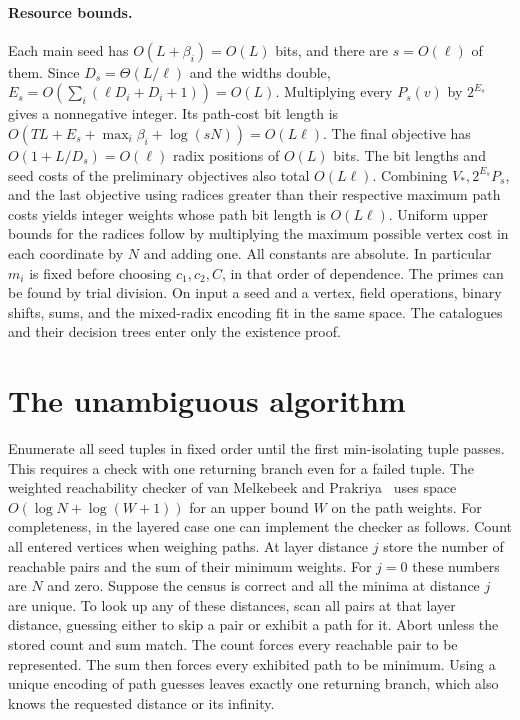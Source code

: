 \documentclass[11pt]{article}
\begin{document}
\paragraph{Resource bounds.}
Each main seed has $O(L+\beta_i)=O(L)$ bits, and there are $s=O(\ell)$
of them. Since $D_s=\Theta(L/\ell)$ and the widths double,
$E_s=O(\sum_i(\ell D_i+D_i+1))=O(L)$. Multiplying every $P_s(v)$ by
$2^{E_s}$ gives a nonnegative integer. Its path-cost bit length is
$O(TL+E_s+\max_i\beta_i+\log(sN))=O(L\ell)$.
The final objective has $O(1+L/D_s)=O(\ell)$ radix positions of
$O(L)$ bits. The bit lengths and seed costs of the preliminary
objectives also total $O(L\ell)$. Combining $V_*,2^{E_s}P_s$, and the
last objective using radices greater than their respective maximum
path costs yields integer weights whose path bit length is $O(L\ell)$.
Uniform upper bounds for the radices follow by multiplying the
maximum possible vertex cost in each coordinate by $N$ and adding one.
All constants are absolute. In particular $m_i$ is fixed before choosing
$c_1,c_2,C$, in that order of dependence. The primes can be found by
trial division. On input a seed and a vertex, field operations, binary
shifts, sums, and the mixed-radix encoding fit in the same space. The
catalogues and their decision trees enter only the existence proof.
\section{The unambiguous algorithm}
Enumerate all seed tuples in fixed order until the first min-isolating
tuple passes. This requires a check with one returning branch even for a
failed tuple. The weighted reachability checker of van Melkebeek and
Prakriya~\cite[Lemma 3.5]{vMP} uses space $O(\log N+\log(W+1))$ for an
upper bound $W$ on the path weights. For completeness, in the layered
case one can implement the checker as follows. Count all entered vertices
when weighing paths. At layer distance $j$ store the number of reachable
pairs and the sum of their minimum weights. For $j=0$ these numbers are
$N$ and zero. Suppose the census is correct and all the minima at distance
$j$ are unique. To look up any of these distances, scan all pairs at that
layer distance, guessing either to skip a pair or exhibit a path for it.
Abort unless the stored count and sum match. The count forces every
reachable pair to be represented. The sum then forces every exhibited path
to be minimum. Using a unique encoding of path guesses leaves exactly one
returning branch, which also knows the requested distance or its infinity.
\end{document}
